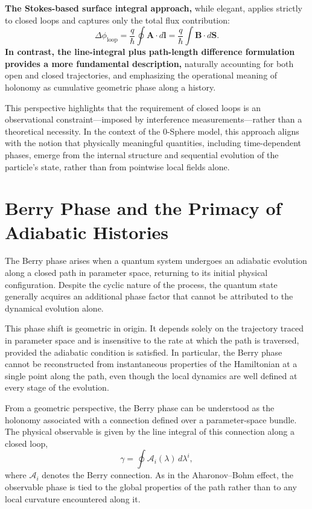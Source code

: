 \documentclass[%
 reprint,
 amsmath,amssymb,
 aps,
 prb,
]{revtex4-2}
\numberwithin{equation}{section}
\begin{document}
\textbf{The Stokes-based surface integral approach,} while elegant, applies strictly to closed loops and captures only the total flux contribution:
\begin{equation}
\Delta \phi_\mathrm{loop} = \frac{q}{\hbar} \oint \mathbf{A} \cdot d\mathbf{l} = \frac{q}{\hbar} \int \mathbf{B} \cdot d\mathbf{S}.
\end{equation}
\textbf{In contrast, the line-integral plus path-length difference formulation provides a more fundamental description,} naturally accounting for both open and closed trajectories, and emphasizing the operational meaning of holonomy as cumulative geometric phase along a history.

This perspective highlights that the requirement of closed loops is an observational constraint—imposed by interference measurements—rather than a theoretical necessity. In the context of the 0-Sphere model, this approach aligns with the notion that physically meaningful quantities, including time-dependent phases, emerge from the internal structure and sequential evolution of the particle's state, rather than from pointwise local fields alone.


\section{Berry Phase and the Primacy of Adiabatic Histories}
\label{sec:berry_phase_histories}

The Berry phase arises when a quantum system undergoes an adiabatic evolution along a closed path in parameter space, returning to its initial physical configuration. Despite the cyclic nature of the process, the quantum state generally acquires an additional phase factor that cannot be attributed to the dynamical evolution alone.

This phase shift is geometric in origin. It depends solely on the trajectory traced in parameter space and is insensitive to the rate at which the path is traversed, provided the adiabatic condition is satisfied. In particular, the Berry phase cannot be reconstructed from instantaneous properties of the Hamiltonian at a single point along the path, even though the local dynamics are well defined at every stage of the evolution.

From a geometric perspective, the Berry phase can be understood as the holonomy associated with a connection defined over a parameter-space bundle. The physical observable is given by the line integral of this connection along a closed loop,
\begin{equation}
\gamma = \oint \mathcal{A}_i(\lambda) \, d\lambda^i,
\end{equation}
where $\mathcal{A}_i$ denotes the Berry connection. As in the Aharonov--Bohm effect, the observable phase is tied to the global properties of the path rather than to any local curvature encountered along it.
\end{document}
